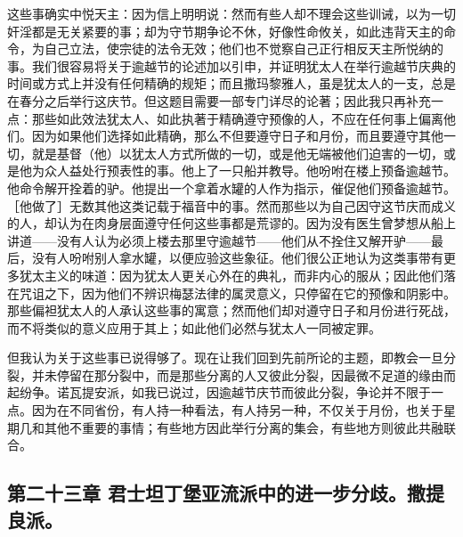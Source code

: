 这些事确实中悦天主：因为信上明明说：然而有些人却不理会这些训诫，以为一切奸淫都是无关紧要的事；却为守节期争论不休，好像性命攸关，如此违背天主的命令，为自己立法，使宗徒的法令无效；他们也不觉察自己正行相反天主所悦纳的事。我们很容易将关于逾越节的论述加以引申，并证明犹太人在举行逾越节庆典的时间或方式上并没有任何精确的规矩；而且撒玛黎雅人，虽是犹太人的一支，总是在春分之后举行这庆节。但这题目需要一部专门详尽的论著；因此我只再补充一点：那些如此效法犹太人、如此执著于精确遵守预像的人，不应在任何事上偏离他们。因为如果他们选择如此精确，那么不但要遵守日子和月份，而且要遵守其他一切，就是基督（他）以犹太人方式所做的一切，或是他无端被他们迫害的一切，或是他为众人益处行预表性的事。他上了一只船并教导。他吩咐在楼上预备逾越节。他命令解开拴着的驴。他提出一个拿着水罐的人作为指示，催促他们预备逾越节。［他做了］无数其他这类记载于福音中的事。然而那些以为自己因守这节庆而成义的人，却认为在肉身层面遵守任何这些事都是荒谬的。因为没有医生曾梦想从船上讲道——没有人认为必须上楼去那里守逾越节——他们从不拴住又解开驴——最后，没有人吩咐别人拿水罐，以便应验这些象征。他们很公正地认为这类事带有更多犹太主义的味道：因为犹太人更关心外在的典礼，而非内心的服从；因此他们落在咒诅之下，因为他们不辨识梅瑟法律的属灵意义，只停留在它的预像和阴影中。那些偏袒犹太人的人承认这些事的寓意；然而他们却对遵守日子和月份进行死战，而不将类似的意义应用于其上；如此他们必然与犹太人一同被定罪。\par

但我认为关于这些事已说得够了。现在让我们回到先前所论的主题，即教会一旦分裂，并未停留在那分裂中，而是那些分离的人又彼此分裂，因最微不足道的缘由而起纷争。诺瓦提安派，如我已说过，因逾越节庆节而彼此分裂，争论并不限于一点。因为在不同省份，有人持一种看法，有人持另一种，不仅关于月份，也关于星期几和其他不重要的事情；有些地方因此举行分离的集会，有些地方则彼此共融联合。\par


\subsection{第二十三章 君士坦丁堡亚流派中的进一步分歧。撒提良派。}

